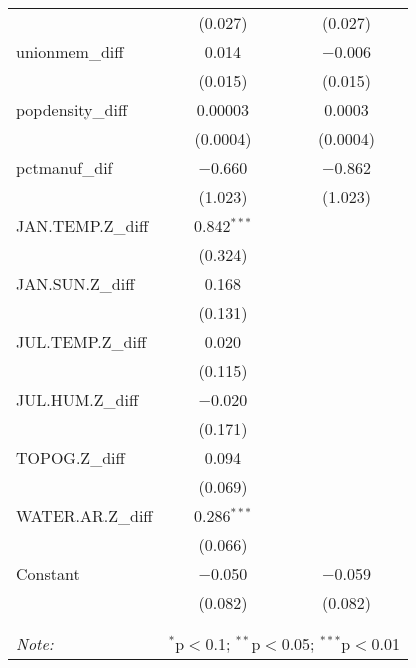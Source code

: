 \begin{table}[!htbp]
\begin{tabular}{@{\extracolsep{5pt}}lcc}
  & (0.027) & (0.027) \\ 
  unionmem\_diff & 0.014 & $-$0.006 \\ 
  & (0.015) & (0.015) \\ 
  popdensity\_diff & 0.00003 & 0.0003 \\ 
  & (0.0004) & (0.0004) \\ 
  pctmanuf\_dif & $-$0.660 & $-$0.862 \\ 
  & (1.023) & (1.023) \\ 
  JAN.TEMP.Z\_diff & 0.842$^{***}$ &  \\ 
  & (0.324) &  \\ 
  JAN.SUN.Z\_diff & 0.168 &  \\ 
  & (0.131) &  \\ 
  JUL.TEMP.Z\_diff & 0.020 &  \\ 
  & (0.115) &  \\ 
  JUL.HUM.Z\_diff & $-$0.020 &  \\ 
  & (0.171) &  \\ 
  TOPOG.Z\_diff & 0.094 &  \\ 
  & (0.069) &  \\ 
  WATER.AR.Z\_diff & 0.286$^{***}$ &  \\ 
  & (0.066) &  \\ 
  Constant & $-$0.050 & $-$0.059 \\ 
  & (0.082) & (0.082) \\ 
 \hline \\[-1.8ex] 
\hline 
\hline \\[-1.8ex] 
\textit{Note:}  & \multicolumn{2}{r}{$^{*}$p$<$0.1; $^{**}$p$<$0.05; $^{***}$p$<$0.01} \\ 
\end{tabular} 
\end{table} 
